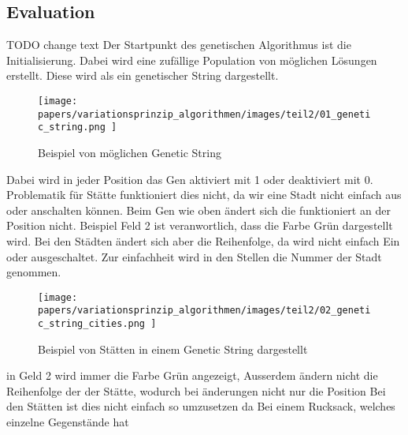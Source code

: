 %
%
%
%
\subsection{Evaluation
\label{genetic_algorithm:evaluation}}

TODO change text
Der Startpunkt des genetischen Algorithmus ist die Initialisierung.
Dabei wird eine zufällige Population von möglichen Lösungen erstellt.
Diese wird als ein genetischer String dargestellt.

\begin{figure} [h]
	\centering
	\texttt{[image: 
        papers/variationsprinzip\_algorithmen/images/teil2/01\_genetic\_string.png
        ]}
	\caption{Beispiel von möglichen Genetic String}
	\label{fig:possible_genetic_string}
\end{figure}

Dabei wird in jeder Position das Gen aktiviert mit 1 oder deaktiviert mit 0.
Problematik für Stätte funktioniert dies nicht, da wir eine Stadt nicht
einfach aus oder anschalten können. Beim Gen wie oben ändert sich die funktioniert
an der Position nicht. Beispiel Feld 2 ist veranwortlich, dass die Farbe Grün
dargestellt wird. Bei den Städten ändert sich aber die Reihenfolge, da wird 
nicht einfach Ein oder ausgeschaltet. Zur einfachheit wird in den Stellen 
die Nummer der Stadt genommen.

\begin{figure} [h]
	\centering
	\texttt{[image: 
        papers/variationsprinzip\_algorithmen/images/teil2/02\_genetic\_string\_cities.png
        ]}
	\caption{Beispiel von Stätten in einem Genetic String dargestellt}
	\label{fig:cities_genetic_string}
\end{figure}


in Geld 2 wird immer die Farbe Grün angezeigt,  Ausserdem ändern nicht die Reihenfolge
der der Stätte, wodurch bei änderungen nicht nur die Position 
Bei den Stätten ist dies nicht einfach so umzusetzen da Bei einem Rucksack, welches einzelne Gegenstände hat 


